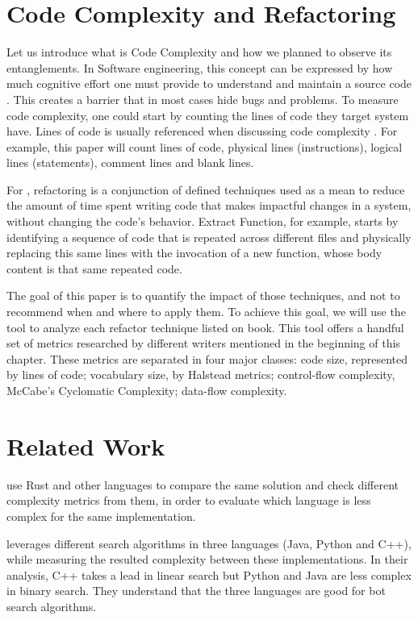 \section{Code Complexity and Refactoring}

Let us introduce what is Code Complexity and how we planned to observe its entanglements.
In Software engineering, this concept can be expressed by how much cognitive effort one must provide
to understand and maintain a source code \cite{article:fmricc}. This creates a barrier that in most cases
hide bugs and problems.
To measure code complexity, one could start by counting the lines of code they target system have.
Lines of code is usually referenced when discussing code complexity \cite{article:rustcc}.
For example, this paper will count lines of code, physical lines (instructions), logical lines (statements), comment lines and
blank lines.

For \cite{book:refactoring}, refactoring is a conjunction of defined techniques used as a mean to reduce the amount of
time spent writing code that makes impactful changes in a system, without changing the code's behavior. Extract Function,
for example, starts by identifying a sequence of code that is repeated across different files and physically replacing
this same lines with the invocation of a new function, whose body content is that same repeated code.

The goal of this paper is to quantify the impact of those techniques, and not to recommend when and where to apply them.
To achieve this goal, we will use the \cite{article:mozilla} tool to analyze each refactor technique listed on
\cite{book:refactoring} book. This tool offers a handful set of metrics researched by
different writers mentioned in the beginning of this chapter. These metrics are separated in four major classes: code size,
represented by lines of code; vocabulary size, by Halstead metrics; control-flow complexity, McCabe's Cyclomatic
Complexity; data-flow complexity.

\section{Related Work}

\cite{ardito2021evaluation} use Rust and other languages to compare the same solution and check different complexity metrics
from them, in order to evaluate which language is less complex for the same implementation.

\cite{muriana2021comparison} leverages different search algorithms in three languages (Java, Python and C++), while
measuring the resulted complexity between these implementations. In their analysis, C++ takes a lead in linear search but
Python and Java are less complex in binary search. They understand that the three languages are good for bot search algorithms.

